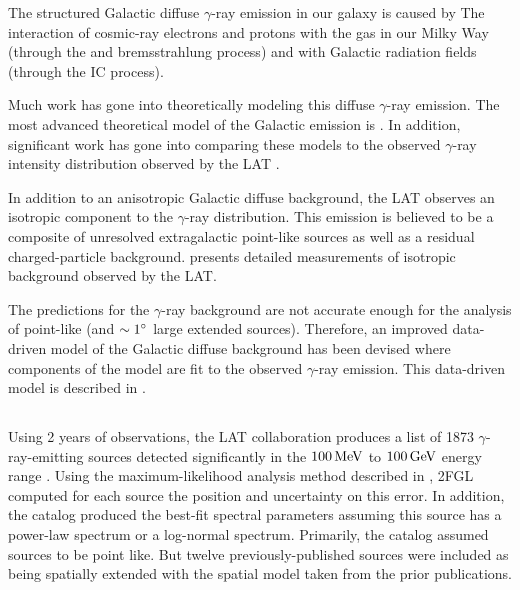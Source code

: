 The structured Galactic diffuse $\gamma$-ray emission in our galaxy is
caused by The interaction of cosmic-ray electrons and protons with the
gas in our Milky Way (through the \pion and bremsstrahlung process)
and with Galactic radiation fields (through the \ac{IC} process).

Much work has gone into theoretically modeling this
diffuse $\gamma$-ray emission. The most advanced
theoretical model of the Galactic emission is \galprop
\citep{strong_1998a_propagation-cosmic-ray,moskalenko_2000a_anisotropic-inverse}.
In addition, significant work has gone into comparing these
models to the observed $\gamma$-ray intensity
distribution observed by the \ac{LAT} \citep{abdo_2009a_fermi-large,
ackermann_2012a_fermi-lat-observations}.

In addition to an anisotropic Galactic diffuse background, the \ac{LAT}
observes an isotropic component to the $\gamma$-ray distribution.
This emission is believed to be a composite of unresolved extragalactic
point-like sources as well as a residual charged-particle background.
\cite{abdo_2010a_spectrum-isotropic} presents detailed measurements of
isotropic background observed by the \ac{LAT}.

The \galprop predictions for the $\gamma$-ray background are not
accurate enough for the analysis of point-like (and $\sim1^\circ$
large extended sources).  Therefore, an improved data-driven model
of the Galactic diffuse background has been devised where components
of the \galprop model are fit to the observed $\gamma$-ray emission.
This data-driven model is described in \cite{nolan_2012_fermi-large}.


\subsection{}

Using 2 years of observations, the \ac{LAT} collaboration produces
a list of 1873 $\gamma$-ray-emitting sources detected significantly
in the $100\,\text{MeV}$ to $100\,\text{GeV}$ energy range
\cite{nolan_2012_fermi-large}.  Using the maximum-likelihood analysis
method described in , \ac{2FGL}
computed for each source the position and uncertainty on this error. In
addition, the catalog produced the best-fit spectral parameters assuming
this source has a power-law spectrum or a log-normal spectrum.
Primarily, the catalog assumed sources to be point like. But twelve
previously-published sources were included as being spatially extended
with the spatial model taken from the prior publications.

